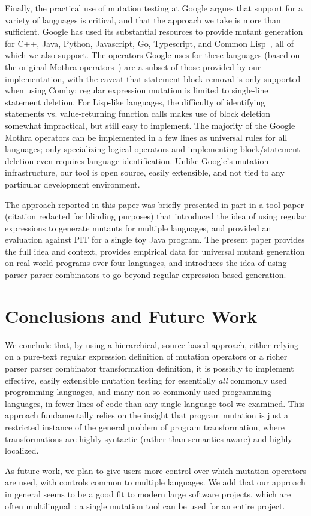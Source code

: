 \documentclass[sigconf,review, anonymous]{acmart}
\begin{document}
Finally, the practical use of mutation testing at Google argues that
support for a variety of languages is critical, and that the approach
we take is more than sufficient.  Google has used its
substantial resources to provide mutant generation for C++, Java,
Python, Javascript, Go, Typescript, and Common
Lisp~\cite{PetrovicMutationGoogle}, all of which we also support.  The
operators Google uses for these
languages (based on the original Mothra operators~\cite{offutt1996experimental}) are a subset of those provided by our implementation, with the caveat
that statement block removal is only supported when using Comby;
regular expression mutation is limited to single-line statement
deletion.  For Lisp-like languages, the difficulty of identifying statements vs. value-returning
function calls makes use of block deletion somewhat impractical, but
still easy to implement.  The majority of the Google Mothra operators
can be implemented in
a few lines as universal rules for all languages; only specializing
logical operators and implementing block/statement deletion even requires
language identification.  Unlike Google's mutation infrastructure, our
tool is open source, easily extensible, and not tied to any particular
development environment.

The approach reported in this paper was briefly presented in part in a
tool paper (citation redacted for blinding purposes) that introduced
the idea of using regular expressions to generate mutants for multiple
languages, and provided an evaluation against PIT for a single toy
Java program.  The present paper provides the full idea and context,
provides empirical data for universal mutant generation on real world
programs over four languages,
and introduces the idea of using parser parser combinators to go
beyond regular expression-based generation.

\section{Conclusions and Future Work}

We conclude that, by using a hierarchical, source-based approach,
either relying on a pure-text regular expression definition of
mutation operators or a richer parser parser combinator transformation
definition, it is possibly to implement effective, easily extensible
mutation testing for essentially \emph{all} commonly used programming
languages, and many non-so-commonly-used programming languages, in
fewer lines of code than any single-language tool we examined.  This
approach fundamentally relies on the insight that program mutation is
just a restricted instance of the general problem of program
transformation, where transformations are highly syntactic (rather
than semantics-aware) and highly localized.

As future work, we plan to give users more control over which mutation
operators are used, with controls common to multiple languages.  We
add that our approach in general seems to be a good fit to modern
large software projects, which are often
multilingual~\cite{Multilingual}: a single mutation tool can be used
for an entire project.



\end{document}
